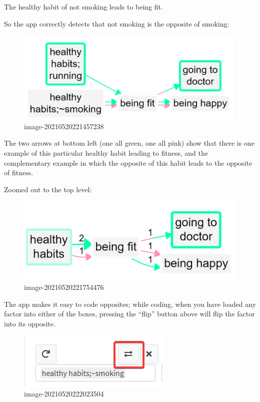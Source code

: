 \documentclass[
]{book}
\begin{document}
The healthy habit of not smoking leads to being fit.

So the app correctly detects that not smoking is the opposite of smoking:

\begin{figure}
\centering
\includegraphics{_assets/image-20210520221457238.png}
\caption{image-20210520221457238}
\end{figure}

The two arrows at bottom left (one all green, one all pink) show that there is one example of this particular healthy habit leading to fitness, and the complementary example in which the opposite of this habit leads to the opposite of fitness.

Zoomed out to the top level:

\begin{figure}
\centering
\includegraphics{_assets/image-20210520221754476.png}
\caption{image-20210520221754476}
\end{figure}

The app makes it easy to code opposites; while coding, when you have loaded any factor into either of the boxes, pressing the ``flip'' button above will flip the factor into its opposite.

\begin{figure}
\centering
\includegraphics{_assets/image-20210520222023504.png}
\caption{image-20210520222023504}
\end{figure}
\end{document}

